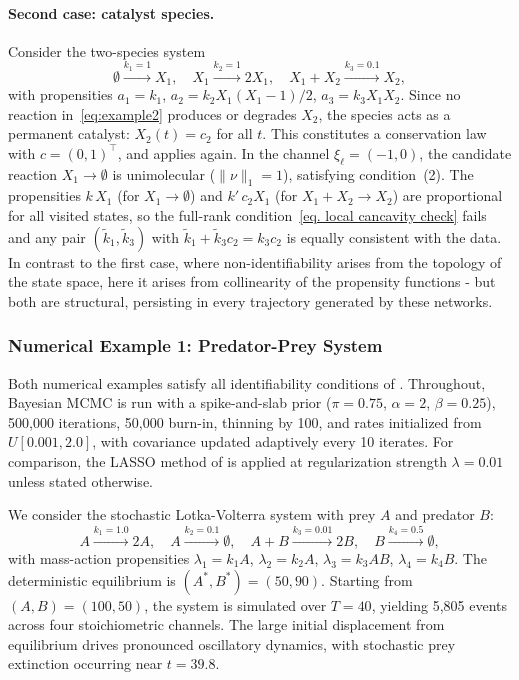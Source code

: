 \paragraph{Second case: catalyst species.} Consider the two-species system
\begin{equation}
\emptyset\xrightarrow{k_1=1}X_1,\quad X_1\xrightarrow{k_2=1}2X_1,\quad X_1+X_2\xrightarrow{k_3=0.1}X_2,
\label{eq:example2}
\end{equation}
with propensities $a_1=k_1$, $a_2=k_2 X_1(X_1{-}1)/2$, $a_3=k_3 X_1 X_2$. Since no reaction in~\eqref{eq:example2} produces or degrades $X_2$, the species acts as a permanent catalyst: $X_2(t)=c_2$ for all $t$. This constitutes a conservation law with $c=(0,1)^\top$, and  applies again. In the channel $\xi_\ell=(-1,0)$, the candidate reaction $X_1\to\emptyset$ is unimolecular ($\|\nu\|_1=1$), satisfying condition~(2). The propensities $k\,X_1$ (for $X_1\to\emptyset$) and $k'\,c_2 X_1$ (for $X_1+X_2\to X_2$) are proportional for all visited states, so the full-rank condition~\eqref{eq. local cancavity check} fails and any pair $(\tilde k_1,\tilde k_3)$ with $\tilde k_1+\tilde k_3 c_2=k_3 c_2$ is equally consistent with the data. In contrast to the first case, where non-identifiability arises from the topology of the state space, here it arises from collinearity of the propensity functions - but both are structural, persisting in every trajectory generated by these networks.

\subsubsection*{Numerical Example 1: Predator-Prey System}

Both numerical examples satisfy all identifiability conditions of . Throughout, Bayesian MCMC is run with a spike-and-slab prior ($\pi=0.75$, $\alpha=2$, $\beta=0.25$), 500{,}000 iterations, 50{,}000 burn-in, thinning by 100, and rates initialized from $U[0.001,2.0]$, with covariance updated adaptively every 10 iterates. For comparison, the LASSO method of \cite{zhang2019learning} is applied at regularization strength $\lambda=0.01$ unless stated otherwise.

We consider the stochastic Lotka-Volterra system with prey $A$ and predator $B$:
\begin{equation}
A\xrightarrow{k_1=1.0}2A,\quad
A\xrightarrow{k_2=0.1}\emptyset,\quad
A+B\xrightarrow{k_3=0.01}2B,\quad
B\xrightarrow{k_4=0.5}\emptyset,
\label{eq:predprey}
\end{equation}
with mass-action propensities $\lambda_1=k_1 A$, $\lambda_2=k_2 A$, $\lambda_3=k_3 AB$, $\lambda_4=k_4 B$. The deterministic equilibrium is $(A^*,B^*)=(50,90)$. Starting from $(A,B)=(100,50)$, the system is simulated over $T=40$, yielding 5{,}805 events across four stoichiometric channels. The large initial displacement from equilibrium drives pronounced oscillatory dynamics, with stochastic prey extinction occurring near $t=39.8$.

